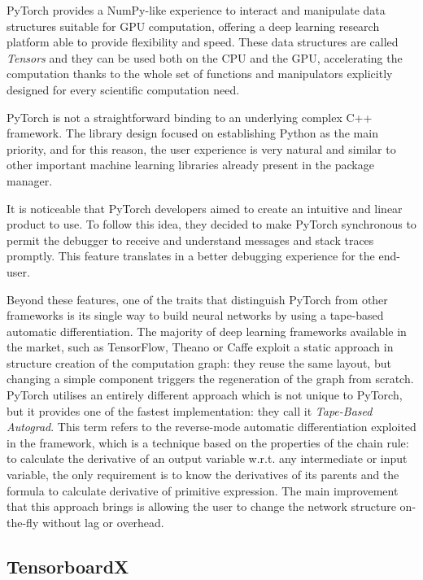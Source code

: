 PyTorch provides a NumPy-like experience to interact and manipulate data structures suitable for GPU computation, offering a deep learning research platform able to provide flexibility and speed. These data structures are called \textit{Tensors} and they can be used both on the CPU and the GPU, accelerating the computation thanks to the whole set of functions and manipulators explicitly designed for every scientific computation need. 

PyTorch is not a straightforward binding to an underlying complex C++ framework. The library design focused on establishing Python as the main priority, and for this reason, the user experience is very natural and similar to other important machine learning libraries already present in the package manager.

It is noticeable that PyTorch developers aimed to create an intuitive and linear product to use. To follow this idea, they decided to make PyTorch synchronous to permit the debugger to receive and understand messages and stack traces promptly. This feature translates in a better debugging experience for the end-user.

Beyond these features, one of the traits that distinguish PyTorch from other frameworks is its single way to build neural networks by using a tape-based automatic differentiation.
The majority of deep learning frameworks available in the market, such as TensorFlow, Theano or Caffe exploit a static approach in structure creation of the computation graph: they reuse the same layout, but changing a simple component triggers the regeneration of the graph from scratch.
PyTorch utilises an entirely different approach which is not unique to PyTorch, but it provides one of the fastest implementation: they call it \textit{Tape-Based Autograd}.
This term refers to the reverse-mode automatic differentiation exploited in the framework, which is a technique based on the properties of the chain rule: to calculate the derivative of an output variable w.r.t. any intermediate or input variable, the only requirement is to know the derivatives of its parents and the formula to calculate derivative of primitive expression.
The main improvement that this approach brings is allowing the user to change the network structure on-the-fly without lag or overhead.

\subsection{TensorboardX}

